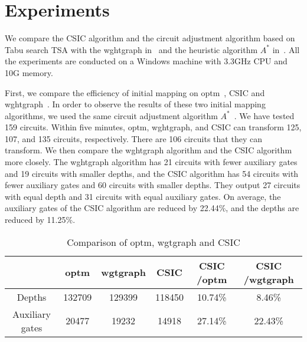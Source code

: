\documentclass[journal]{IEEEtran}
\begin{document}
\section{Experiments}
\label{Experiment}
We compare the  CSIC  algorithm 
and the circuit adjustment algorithm based on Tabu search TSA with the wghtgraph in~\cite{2020Qubit} and the heuristic algorithm $ A^{*}$  in~\cite{Zulehner2017}.
All the experiments are conducted on a Windows machine with 3.3GHz CPU and 10G memory. 
 
First, we compare the efficiency of initial mapping on optm~\cite{Zulehner2017},  CSIC and wghtgraph~\cite{2020Qubit}. In order to  observe the results of these two initial mapping algorithms, we used the same circuit adjustment algorithm $A^{*}$~\cite{Zulehner2017}.
We have tested 159 circuits. Within five minutes, optm,  wghtgraph, and CSIC can transform 125, 107, and  135 circuits, respectively. There are 106 circuits that they can transform. We then compare the wghtgraph algorithm and the CSIC algorithm more closely. The wghtgraph algorithm has 21 circuits with fewer auxiliary gates  and 19 circuits with smaller depths, and the CSIC algorithm has 54 circuits with fewer auxiliary gates and 60 circuits with  smaller depths. They output 27 circuits with equal depth and  31 circuits with equal auxiliary gates. On average, the auxiliary gates of the CSIC algorithm are reduced by 22.44\%, 
and the depths are reduced by 11.25\%.
\begin{table*}[htbp]
	\begin{center}  
	\begin{tabular}{|c|c|c|c|c|c|}
	\hline
	    	&  optm & wgtgraph &CSIC & CSIC /optm & CSIC /wgtgraph\\
	\hline
	 Depths 	&	132709	&   129399	&  118450 	& 10.74\%  &8.46\%   \\
	\hline
	 Auxiliary gates 	&	20477	&  19232 	&  14918 & 27.14\% 	&  22.43\%  \\
	\hline
	\end{tabular} 
	\end{center} 
	\caption{Comparison of optm, wgtgraph and CSIC}
	\label{tab1}
	\end{table*}
\end{document}
